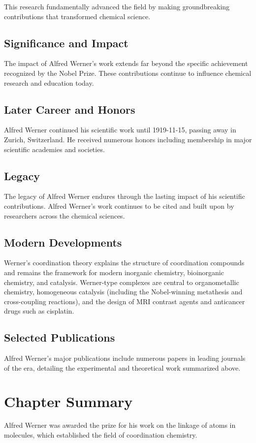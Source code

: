 This research fundamentally advanced the field by making groundbreaking contributions that transformed chemical science.

\subsection*{Significance and Impact}

The impact of Alfred Werner's work extends far beyond the specific achievement recognized by the Nobel Prize.
These contributions continue to influence chemical research and education today.

\subsection*{Later Career and Honors}

Alfred Werner continued his scientific work until 1919-11-15, passing away in Zurich, Switzerland.
He received numerous honors including membership in major scientific academies and societies.

\subsection*{Legacy}

The legacy of Alfred Werner endures through the lasting impact of his scientific contributions.
Alfred Werner's work continues to be cited and built upon by researchers across the chemical sciences.

\subsection*{Modern Developments}

Werner's coordination theory explains the structure of coordination compounds and remains the framework for modern inorganic chemistry, bioinorganic chemistry, and catalysis. Werner-type complexes are central to organometallic chemistry, homogeneous catalysis (including the Nobel-winning metathesis and cross-coupling reactions), and the design of MRI contrast agents and anticancer drugs such as cisplatin.

\subsection*{Selected Publications}

Alfred Werner's major publications include numerous papers in leading journals of the era, detailing the experimental and theoretical work summarized above.

\clearpage

\section*{Chapter Summary}

Alfred Werner was awarded the prize for his work on the linkage of atoms in molecules, which established the field of coordination chemistry.
